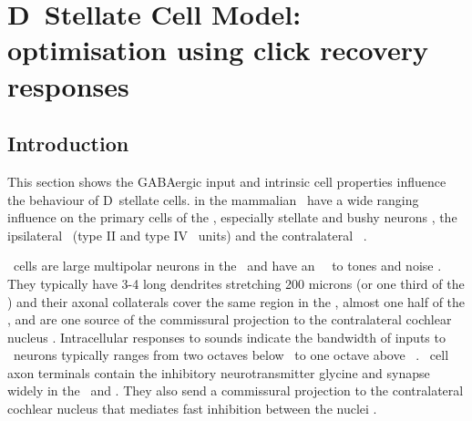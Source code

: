 

\section[DS Cell Model]{D~Stellate Cell Model: optimisation using click recovery responses    \label{sec:d-stellate-cell-model}}

\subsection{Introduction    \label{sec:DS:introduction}}

This section shows the GABAergic input and intrinsic cell properties
influence the behaviour of D~stellate cells.  in
the mammalian \VCN~have a wide ranging influence on the primary cells
of the \VCN, especially stellate and bushy neurons
\citep{RhodeSmithEtAl:1983}, the ipsilateral \DCN~(type II and type IV
\EIRA~units) and the contralateral \CN~\citep{NeedhamPaolini:2007}.


  
\DS~cells are large multipolar neurons in the \VCN~and have an \OnC~\PSTH~to
tones and noise \citep{SmithRhode:1989, NeedhamPaolini:2006}.  They typically
have 3-4 long dendrites stretching 200 microns (or one third of the \VCN) and
their axonal collaterals cover the same region in the \VCN, almost one half of
the \DCN, and are one source of the commissural projection to the contralateral
cochlear nucleus \citep{Cant:1992,Cant:1981,SchofieldCant:1996,CantBenson:2003,
  NeedhamPaolini:2007, PaoliniClark:1999}. Intracellular responses to sounds
indicate the bandwidth of inputs to \DS~neurons typically ranges from two
octaves below \CF~to one octave above \CF~\citep{PalmerJiangEtAl:1996,
  JiangPalmerEtAl:1996, PaoliniClark:1999}. \DS~cell axon terminals contain the
inhibitory neurotransmitter glycine and synapse widely in the \VCN~and \DCN\@.
They also send a commissural projection to the contralateral cochlear nucleus
that mediates fast inhibition between the nuclei \citep{NeedhamPaolini:2003,
  NeedhamPaolini:2006, Oertel:1997}.

